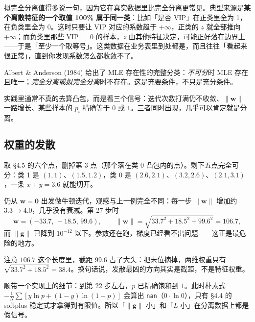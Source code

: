 \documentclass[11pt,a4paper,fontset=windows,zihao=-4]{ctexart}
\newcommand{\bw}{\mathbf{w}}
\newcommand{\bg}{\mathbf{g}}
\newcommand{\bzero}{\mathbf{0}}
\newcommand{\norm}[1]{\lVert #1\rVert}
\begin{document}
拟完全分离值得多说一句，因为它在真实数据里比完全分离更常见。典型来源是\textbf{某个离散特征的一个取值 100\% 属于同一类}：比如「是否 VIP」在正类里全为 1，在负类里全为 0。这时只要让 VIP 对应的系数趋于 $+\infty$，正类的 $z$ 就全部推向 $+\infty$；而负类里那些 VIP $=0$ 的样本，$z$ 由其他特征决定，可能正好落在边界上——于是「至少一个取等号」。这类数据在业务表里到处都是，而且往往「看起来很正常」，直到你发现系数怎么都收敛不了。

\begin{add}
Albert \& Anderson (1984) 给出了 MLE 存在性的完整分类：\emph{不可分}时 MLE 存在且唯一；\emph{完全分离或拟完全分离}时不存在。这是充要条件，不只是充分条件。

实践里通常不真的去算凸包，而是看三个信号：迭代次数打满仍不收敛、$\norm{\bw}$ 一路增长、某些样本的 $p_i$ 精确等于 $0$ 或 $1$。三者同时出现，几乎可以肯定就是分离。
\end{add}

\subsection{权重的发散}

\begin{exm}
取 \S4.5 的六个点，删掉第 3 点（那个落在类 0 凸包内的点）。剩下五点完全可分：类 1 是 $(1,1)$、$(1.5,1.2)$，类 0 是 $(2.6,2.1)$、$(3.2,2.6)$、$(2.1,3.1)$，一条 $x+y=3.6$ 就能切开。

仍从 $\bw=\bzero$ 出发做牛顿迭代，观感与上一例完全不同：每一步 $\norm{\bw}$ 增加约 $3.3\to4.0$，几乎没有衰减。第 27 步时
\[
  \bw=(-33.7,\,-18.5,\,99.6),\qquad \norm{\bw}=\sqrt{33.7^{2}+18.5^{2}+99.6^{2}}=106.7,
\]
而 $\norm{\bg}$ 已降到 $10^{-12}$ 以下。参数还在跑，梯度已经看不出问题——这正是最危险的地方。

注意 $106.7$ 这个长度里，截距 $99.6$ 占了大头：把末位摘掉，两维权重只有 $\sqrt{33.7^{2}+18.5^{2}}=38.4$。换句话说，发散最凶的方向其实是截距，不是特征权重。

顺带一个实现上的细节：到第 22 步左右，$p$ 已精确饱和到 $1$。此时朴素式 $-\frac1N\sum[y\ln p+(1-y)\ln(1-p)]$ 会算出 \texttt{nan}（$0\cdot\ln0$），只有 \S4.4 的 softplus 稳定式才拿得到有限值。所以「$\norm{\bg}$ 小」和「$L$ 小」在分离数据上都是假信号。
\end{exm}
\end{document}
